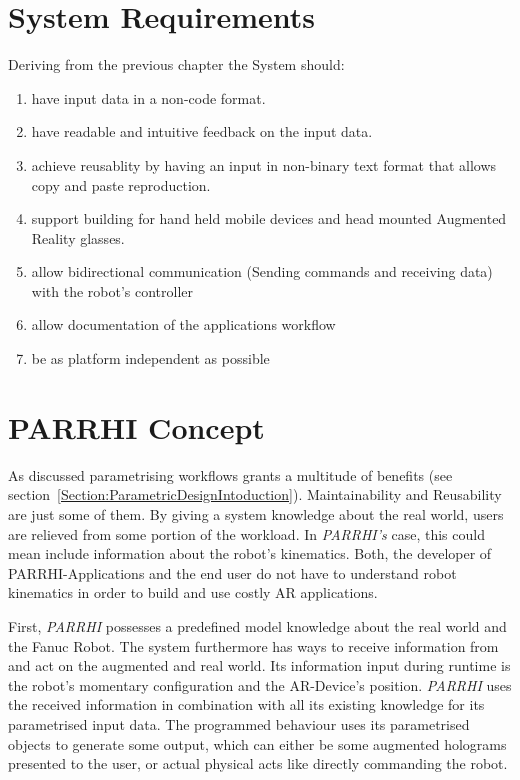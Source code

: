 \section{System Requirements}\label{Section:SystemRequirements}
Deriving from the previous chapter the System should:
\begin{enumerate}
	\setlength\itemsep{-1em}
	\item have input data in a non-code format.
	\item have readable and intuitive feedback on the input data.
	\item achieve reusablity by having an input in non-binary text format that allows copy and paste reproduction.
	\item support building for hand held mobile devices and head mounted Augmented Reality glasses.
	\item allow bidirectional communication (Sending commands and receiving data) with the robot's controller 
	\item allow documentation of the applications workflow
	\item be as platform independent as possible
\end{enumerate}

\clearpage
\section{PARRHI Concept}

As discussed parametrising workflows grants a multitude of benefits (see section~\ref{Section:ParametricDesignIntoduction}). Maintainability and Reusability are just some of them. By giving a system knowledge about the real world, users are relieved from some portion of the workload. In \textit{PARRHI's} case, this could mean include information about the robot's kinematics. Both, the developer of PARRHI-Applications and the end user do not have to understand robot kinematics in order to build and use costly AR applications. 

First, \textit{PARRHI} possesses a predefined model knowledge about the real world and the Fanuc Robot. The system furthermore has ways to receive information from and act on the augmented and real world. Its information input during runtime is the robot's momentary configuration and the AR-Device's position. \textit{PARRHI} uses the received information in combination with all its existing knowledge for its parametrised input data. The programmed behaviour uses its parametrised objects to generate some output, which can either be some augmented holograms presented to the user, or actual physical acts like directly commanding the robot.

